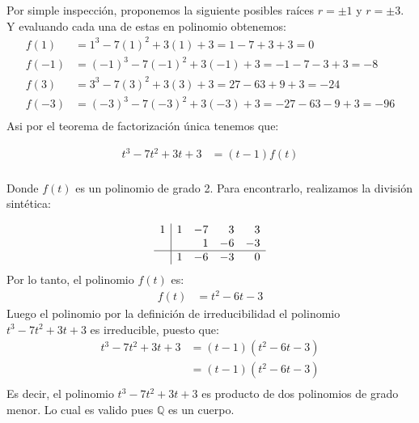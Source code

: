 \begin{solucion}
    Por simple inspección, proponemos la siguiente posibles raíces $r=\pm 1$ y $r=\pm 3$. Y evaluando cada una de estas en polinomio obtenemos:
    \begin{align*}
    f(1) &= 1^3 - 7(1)^2 + 3(1) + 3 = 1 - 7 + 3 + 3 = 0 \\
    f(-1) &= (-1)^3 - 7(-1)^2 + 3(-1) + 3 = -1 - 7 - 3 + 3 = -8 \\
    f(3) &= 3^3 - 7(3)^2 + 3(3) + 3 = 27 - 63 + 9 + 3 = -24 \\
    f(-3) &= (-3)^3 - 7(-3)^2 + 3(-3) + 3 = -27 - 63 - 9 + 3 = -96 \\
    \end{align*}
    Asi por el teorema de factorización única tenemos que:

    \begin{align*}
        t^3 - 7t^2 + 3t + 3 &= (t-1)f(t) \\
    \end{align*}

    Donde $f(t)$ es un polinomio de grado 2. Para encontrarlo, realizamos la división sintética:

    \begin{align*}
        \begin{array}{r|rrrr}
            1 & 1 & -7 & 3 & 3 \\
              &   & 1 & -6 & -3 \\
            \hline
              & 1 & -6 & -3 & 0 \\
        \end{array}
    \end{align*}
    Por lo tanto, el polinomio $f(t)$ es:
    \begin{align*}
        f(t) &= t^2 - 6t - 3
    \end{align*}
    Luego el polinomio por la definición de irreducibilidad el polinomio $t^3 - 7t^2 + 3t + 3$ es irreducible, puesto que:
    \begin{align*}
        t^3 - 7t^2 + 3t + 3 &= (t-1)(t^2 - 6t - 3) \\
        &= (t-1)(t^2 - 6t - 3) \\
    \end{align*}
    Es decir, el polinomio $t^3 - 7t^2 + 3t + 3$ es producto de dos polinomios de grado menor. Lo cual es valido pues $\mathbb Q$ es un cuerpo.
\end{solucion}